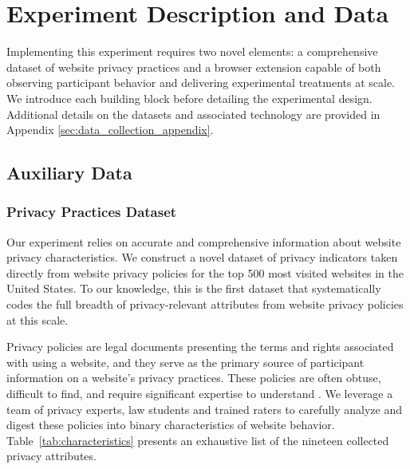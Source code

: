 \documentclass[12pt]{article}
\theoremstyle{definition}
\theoremstyle{remark}
\begin{document}
\section{Experiment Description and Data}\label{sec:experiment}

Implementing this experiment requires two novel elements: a comprehensive dataset of website privacy practices and a browser extension capable of both observing participant behavior and delivering experimental treatments at scale. We introduce each building block before detailing the experimental design. Additional details on the datasets and associated technology are provided in Appendix \ref{sec:data_collection_appendix}.

\subsection{Auxiliary Data}

\subsubsection{Privacy Practices Dataset}\label{sec:policydata}

Our experiment relies on accurate and comprehensive information about website privacy characteristics. We construct a novel dataset of privacy indicators taken directly from website privacy policies for the top 500 most visited websites in the United States. To our knowledge, this is the first dataset that systematically codes the full breadth of privacy-relevant attributes from website privacy policies at this scale.

Privacy policies are legal documents presenting the terms and rights associated with using a website, and they serve as the primary source of participant information on a website's privacy practices. These policies are often obtuse, difficult to find, and require significant expertise to understand \citep{10.1145/3573128.3604902}. We leverage a team of privacy experts, law students and trained raters to carefully analyze and digest these policies into binary characteristics of website behavior. Table~\ref{tab:characteristics} presents an exhaustive list of the nineteen collected privacy attributes.
\end{document}

